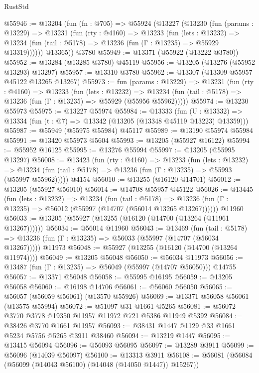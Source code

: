 \begin{lexlean}{RustStd}
\begin{coremodule}
@55946 := @13204
    (fun (fn : @705) =>
    @55924
      (@13227
        (@13230
          (fun (params : @13229) =>
          @13231
            (fun (rty : @4160) =>
            @13233
              (fun (lets : @13232) =>
              @13234 (fun (tail : @5178) => @13236 (fun (Γ : @13235) => @55929 @13319))))))
        @13365))
    @3780
@55949 := @13371 (@55922 (@13222 @3780))
@55952 := @13284 (@13285 @3780) @45119
@55956 := @13205 (@13276 (@55952 @13293) @13297)
@55957 := @13310 @3780
@55962 := @13307 (@13309 @55957 @45122 @13265 @13267)
@55973 := fun (params : @13229) =>
  @13231
    (fun (rty : @4160) =>
    @13233
      (fun (lets : @13232) =>
      @13234 (fun (tail : @5178) => @13236 (fun (Γ : @13235) => @55929 (@55956 @55962)))))
@55974 := @13230 @55973
@55975 := @13227 @55974
@55984 := @13333
    (fun (U : @13332) => @13334 (fun (t : @7) => @13342 (@13205 (@13348 @45119 @13223) @13359)))
@55987 := @55949 (@55975 @55984) @45117
@55989 := @13190 @55974 @55984
@55991 := @13420 @55973 @5604
@55993 := @13205 (@55927 @16122)
@55994 := @55952 @16125
@55995 := @13276 @55994
@55997 := @13205 (@55995 @13297)
@56008 := @13423
    (fun (rty : @4160) =>
    @13233
      (fun (lets : @13232) =>
      @13234 (fun (tail : @5178) => @13236 (fun (Γ : @13235) => @55993 (@55997 @55962)))))
    @4154
@56010 := @13255 (@16120 @14701)
@56012 := @13205 (@55927 @56010)
@56014 := @14708 @55957 @45122
@56026 := @13445
    (fun (lets : @13232) =>
    @13234
      (fun (tail : @5178) =>
      @13236 (fun (Γ : @13235) => @56012 (@55997 (@14707 (@56014 @13265 @13267))))))
    @11960
@56033 := @13205 (@55927 (@13255 (@16120 (@14700 (@13264 (@11961 @13267))))))
@56034 := @56014 @11960
@56043 := @13469
    (fun (tail : @5178) => @13236 (fun (Γ : @13235) => @56033 (@55997 (@14707 (@56034 @13267)))))
    @11973
@56048 := @55927 (@13255 (@16120 (@14700 (@13264 @11974))))
@56049 := @13205 @56048
@56050 := @56034 @11973
@56056 := @13487 (fun (Γ : @13235) => @56049 (@55997 (@14707 @56050))) @14755
@56057 := @13371 @56048
@56058 := @55995 @16195
@56059 := @13205 @56058
@56060 := @16198 @14706
@56061 := @56060 @56050
@56065 := @56057 (@56059 @56061) (@13570 @55926)
@56069 := @13371 @56058 @56061 (@13575 @55994)
@56072 := @51097 @31 @1661 @5265
@56081 := @56072 @3770 @3778 @19350 @11957 @11972 @721 @5386 @11949 @5392
@56084 := @38426 @3770 @1661 @11957
@56093 := @38431 @1447 @1129 @33 @1661 @5234 @5756 @5265 @3911 @38460
@56094 := @13219 @1447
@56095 := @13415 @56094
@56096 := @56093 @56095
@56097 := @13289 @3911
@56099 := @56096 (@14039 @56097)
@56100 := @13313 @3911
@56108 := @56081 (@56084 (@56099 (@14043 @56100) (@14048 (@14050 @1447)) @15267))

\end{coremodule}
\end{lexlean}
